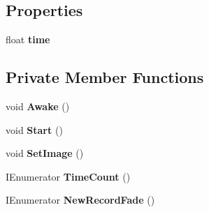 \subsection*{Properties}
\begin{DoxyCompactItemize}
\item 
\mbox{\label{class_time_counter_a92385d5b0b06f0bb67a094126a0b9d93}} 
float {\bfseries time}
\end{DoxyCompactItemize}
\subsection*{Private Member Functions}
\begin{DoxyCompactItemize}
\item 
\mbox{\label{class_time_counter_a90d9ecbcce4b9373c1f179c858c585c9}} 
void {\bfseries Awake} ()
\item 
\mbox{\label{class_time_counter_a180b065213a4018a5592193c5040b0b5}} 
void {\bfseries Start} ()
\item 
\mbox{\label{class_time_counter_a2ac5a58a86bdd7273498648c2ab68a5d}} 
void {\bfseries Set\+Image} ()
\item 
\mbox{\label{class_time_counter_a59cedb661dcbea8cd2ebc9ae4ee4ed76}} 
I\+Enumerator {\bfseries Time\+Count} ()
\item 
\mbox{\label{class_time_counter_a506dc6e68d75dd85c9f268f495d322b9}} 
I\+Enumerator {\bfseries New\+Record\+Fade} ()
\end{DoxyCompactItemize}
